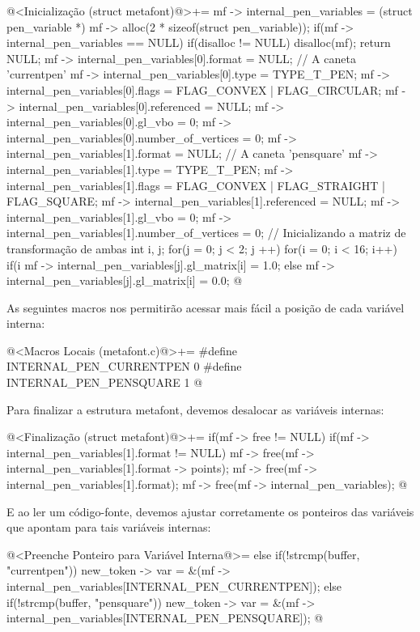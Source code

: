 \iniciocodigo
@<Inicialização (struct metafont)@>+=
mf -> internal_pen_variables = (struct pen_variable *)
                                 mf -> alloc(2 * sizeof(struct pen_variable));
if(mf -> internal_pen_variables == NULL){
  if(disalloc != NULL)
    disalloc(mf);
  return NULL;
}
mf -> internal_pen_variables[0].format = NULL; // A caneta 'currentpen'
mf -> internal_pen_variables[0].type = TYPE_T_PEN;
mf -> internal_pen_variables[0].flags = FLAG_CONVEX | FLAG_CIRCULAR;
mf -> internal_pen_variables[0].referenced = NULL;
mf -> internal_pen_variables[0].gl_vbo = 0;
mf -> internal_pen_variables[0].number_of_vertices = 0;
mf -> internal_pen_variables[1].format = NULL; // A caneta 'pensquare'
mf -> internal_pen_variables[1].type = TYPE_T_PEN;
mf -> internal_pen_variables[1].flags = FLAG_CONVEX | FLAG_STRAIGHT |
                                        FLAG_SQUARE;
mf -> internal_pen_variables[1].referenced = NULL;
mf -> internal_pen_variables[1].gl_vbo = 0;
mf -> internal_pen_variables[1].number_of_vertices = 0;
{ // Inicializando a matriz de transformação de ambas
  int i, j;
  for(j = 0; j < 2; j ++)
    for(i = 0; i < 16; i++)
      if(i %
        mf -> internal_pen_variables[j].gl_matrix[i] = 1.0;
      else
        mf -> internal_pen_variables[j].gl_matrix[i] = 0.0;
}
@
\fimcodigo

As seguintes macros nos permitirão acessar mais fácil a posição de
cada variável interna:

\iniciocodigo
@<Macros Locais (metafont.c)@>+=
#define INTERNAL_PEN_CURRENTPEN 0
#define INTERNAL_PEN_PENSQUARE  1
@
\fimcodigo

Para finalizar a estrutura metafont, devemos desalocar as variáveis
internas:

\iniciocodigo
@<Finalização (struct metafont)@>+=
if(mf -> free != NULL){
  if(mf -> internal_pen_variables[1].format != NULL){
    mf -> free(mf -> internal_pen_variables[1].format -> points);
    mf -> free(mf -> internal_pen_variables[1].format);
  }
  mf -> free(mf -> internal_pen_variables);
}
@
\fimcodigo

E ao ler um código-fonte, devemos ajustar corretamente os ponteiros
das variáveis que apontam para tais variáveis internas:

\iniciocodigo
@<Preenche Ponteiro para Variável Interna@>=
else if(!strcmp(buffer, "currentpen"))
  new_token -> var =
          &(mf -> internal_pen_variables[INTERNAL_PEN_CURRENTPEN]);
else if(!strcmp(buffer, "pensquare"))
  new_token -> var =
          &(mf -> internal_pen_variables[INTERNAL_PEN_PENSQUARE]);
@
\fimcodigo

